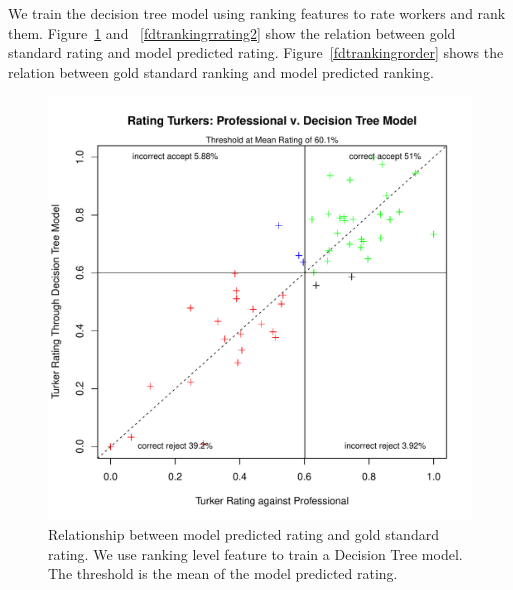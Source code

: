 \documentclass[11pt]{article}
\begin{document}
We train the decision tree model using ranking features to rate workers and rank them. Figure~\ref{fdtrankingrrating1} and ~\ref{fdtrankingrrating2} show the relation between gold standard rating and model predicted rating. Figure~\ref{fdtrankingrorder} shows the relation between gold standard ranking and model predicted ranking.

\begin{figure}[htbp]
  \centering
  \includegraphics[width=\linewidth]{Rankingfeature/rrankingrankingfeaturedt.pdf}
  \caption{Relationship between model predicted rating and gold standard rating. We use ranking level feature to train a Decision Tree model. The threshold is the mean of the model predicted rating.}
    \label{fdtrankingrrating1}
\end{figure}
\end{document}
